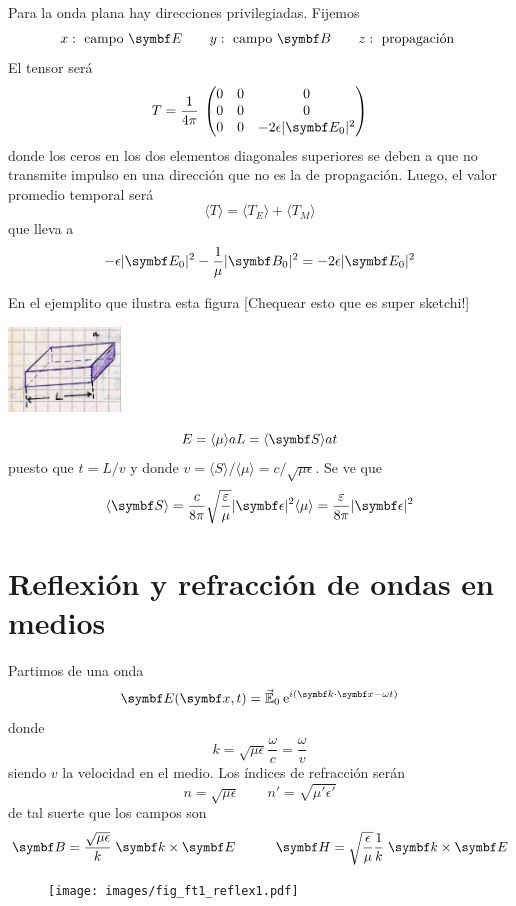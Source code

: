 \documentclass[10pt,oneside]{CBFT_book}
\begin{document}
Para la onda plana hay direcciones privilegiadas. Fijemos
\[
	x : \text{ campo } \vb{E} \qquad 
	y : \text{ campo } \vb{B} \qquad 
	z : \text{ propagación }
\]
El tensor será
\[
	T = \frac{1}{4\pi} \: \begin{pmatrix}
	        0	& 0 	& 0 \\
		0	& 0	& 0 \\
		0	& 0	& -2\epsilon|\vb{E}_0|^2
	       \end{pmatrix}
\]
donde los ceros en los dos elementos diagonales superiores se deben a que no transmite impulso en una
dirección que no es la de propagación. 
Luego, el valor promedio temporal será
\[
	\langle T \rangle =  \langle T_E \rangle + \langle T_M \rangle
\]
que lleva a
\[
	- \epsilon|\vb{E}_0|^2  - \frac{1}{\mu} |\vb{B}_0|^2 = -2\epsilon|\vb{E}_0|^2
\]

En el ejemplito que ilustra esta figura [Chequear esto que es super sketchi!]

\includegraphics[width=0.225\textwidth]{images/fig_ft1_paraTensorOndasMax.jpg}
	
\[
	E = \langle \mu \rangle a L = \langle \vb{S} \rangle a t
\]
puesto que $t=L/v$ y donde $v = \langle S \rangle / \langle \mu \rangle  = c / \sqrt{\mu \epsilon}$.
Se ve que 
\[
	\langle \vb{S} \rangle =  \frac{c}{8\pi} \sqrt{ \frac{\varepsilon}{\mu} }|\vb{\epsilon}|^2
	\langle \mu \rangle = \frac{\varepsilon}{8\pi}  |\vb{\epsilon}|^2
\]

\section{Reflexión y refracción de ondas en medios}

Partimos de una onda
\[
	\vb{E}( \vb{x},t )= \vec{\mathbb{E}}_0 \euler^{i( \pe{k}{x} -\omega t)}
\]
donde 
\[
	k = \sqrt{\mu\epsilon} \frac{\omega}{c} = \frac{\omega}{v}
\]
siendo $v$ la velocidad en el medio. Los índices de refracción serán 
\[
	n = \sqrt{\mu \epsilon} \qquad  n' = \sqrt{\mu' \epsilon'}
\]
de tal suerte que los campos son 
\[
	\vb{B} = \frac{\sqrt{\mu\epsilon}}{k} \; \pv{k}{E} \qquad \quad 
		\vb{H} = \sqrt{\frac{\epsilon}{\mu}} \frac{1}{k} \; \pv{k}{E}
\]
\begin{figure}[htb]
	\begin{center}
	\texttt{[image: images/fig\_ft1\_reflex1.pdf]}	 
	\end{center}
	\caption{}
\end{figure} 
\end{document}

